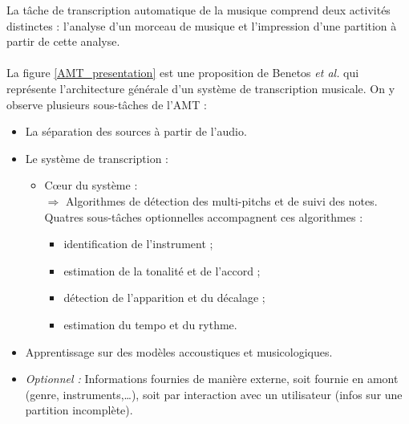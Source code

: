 La tâche de transcription automatique de la musique comprend deux activités distinctes : l'analyse d'un morceau de musique et l'impression d'une partition à partir de cette analyse.\\\\
La figure \ref{AMT_presentation} est une proposition de Benetos \textit{et al.} \cite{future_directions} qui représente l'architecture générale d'un système de transcription musicale. On y observe plusieurs sous-tâches de l’AMT :
\begin{itemize}
	\item La séparation des sources à partir de l’audio.
	\item Le système de transcription :
	\begin{itemize}
		\item Cœur du système :\\
		$\Rightarrow$ Algorithmes de détection des multi-pitchs et de suivi des \tab notes.\\
		Quatres sous-tâches optionnelles accompagnent ces algorithmes :
		\begin{itemize}
			\item identification de l'instrument ;
			\item estimation de la tonalité et de l'accord ;
			\item détection de l'apparition et du décalage ;
			\item estimation du tempo et du rythme.
		\end{itemize}
	\end{itemize}
	\item Apprentissage sur des modèles accoustiques et musicologiques.
	\item \textit{Optionnel :} Informations fournies de manière externe, soit fournie en amont (genre, instruments,…), soit par interaction avec un utilisateur (infos sur une partition incomplète).
\end{itemize}
